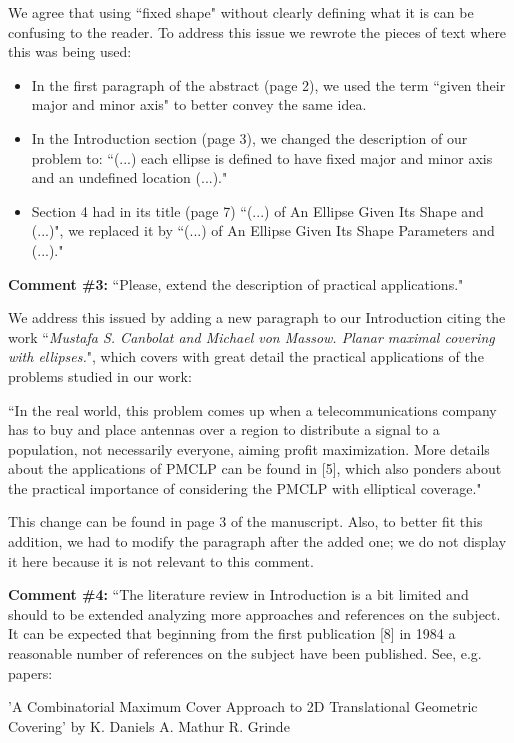 		We agree that using ``fixed shape" without clearly defining what it is can be confusing to the reader. To address this issue we rewrote the pieces of text where this was being used:
		\begin{itemize}
			\item In the first paragraph of the abstract (page 2), we used the term ``given their major and minor axis" to better convey the same idea.
			
			\item In the Introduction section (page 3), we changed the description of our problem to: ``(...) each ellipse is defined to have fixed major and minor axis and an undefined location (...)."
			
			\item Section 4 had in its title (page 7) ``(...) of An Ellipse Given Its Shape and (...)", we replaced it by ``(...) of An Ellipse Given Its Shape Parameters and (...)."
		\end{itemize}
		
		\textbf{Comment \#3:} ``Please, extend the description of practical applications."
		
		We address this issued by adding a new paragraph to our Introduction citing the work ``\textit{Mustafa S. Canbolat and Michael von Massow. Planar maximal covering with ellipses.}", which covers with great detail the practical applications of the problems studied in our work:
		
		``In the real world, this problem comes up when a telecommunications company has to buy and
		place antennas over a region to distribute a signal to a population, not necessarily everyone, aiming
		profit maximization. More details about the applications of PMCLP can be found in [5], which also
		ponders about the practical importance of considering the PMCLP with elliptical coverage."
		
		This change can be found in page 3 of the manuscript. Also, to better fit this addition, we had to modify the paragraph after the added one; we do not display it here because it is not relevant to this comment.
		
		\textbf{Comment \#4:} ``The literature review in Introduction is a bit limited and should to be extended analyzing more approaches and references on the subject. It can be expected that beginning from the first publication [8] in 1984 a reasonable number of references on the subject have been published. See, e.g. papers:
		
		'A Combinatorial Maximum Cover Approach to 2D Translational Geometric Covering' by K. Daniels A. Mathur R. Grinde
		
